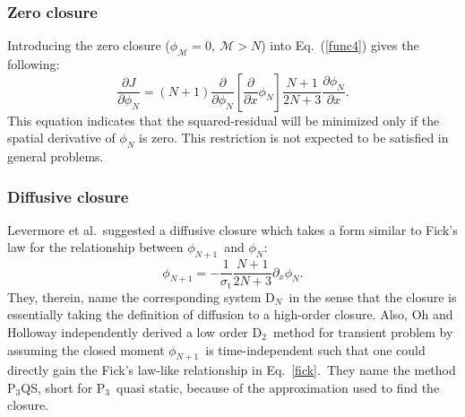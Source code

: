 \documentclass[review]{elsarticle}
\newcommand{\st}{\sigma_\mathrm{t}}
\newcommand{\pn}{P$_N$}
\newcommand{\dn}{D$_N$}
\newcommand{\ppz}{\partial_x}%
\newcommand{\psii}[1]{\phi_\ensuremath{{#1}}}
\begin{document}
\subsubsection{Zero closure}
Introducing the zero closure ($\psii{\mathcal{M}}=0,~\mathcal{M}>N$) into Eq.~(\ref{func4}) gives the following:
\begin{equation}\label{bd}
\frac{\partial J}{\partial\psii{N}}=(N+1)
\frac{\partial}{\partial\psii{N}}\left[\frac{\partial}{\partial x}\psii{N}\right]
\frac{N+1}{2N+3}\frac{\partial\phi_{N}}{\partial x}
.
\end{equation}
This equation indicates that the squared-residual will be minimized only if the spatial derivative of $\phi_N$ is zero.  This restriction is not expected to be satisfied in general problems.


\subsubsection{Diffusive closure}
Levermore et al.~suggested a diffusive closure which takes a form similar to Fick's law for the relationship between $\psii{N+1}$~and $\psii{N}$\cite{levermoredn}:
\begin{equation}\label{fick}
\psii{N+1}=-\frac{1}{\st}\frac{N+1}{2N+3}\ppz\psii{N}.
\end{equation}
They, therein, name the corresponding system D$_N$~in the sense that the closure is essentially taking the definition of diffusion to a high-order closure. Also, Oh and Holloway independently derived a low order D$_2$~method for transient problem by assuming the closed moment $\psii{N+1}$~is time-independent such that one could directly gain the Fick's law-like relationship in Eq.~\eqref{fick}\cite{p3qs}.~They name the method P$_3$QS, short for P$_3$~quasi static, because of the approximation used to find the closure. 
\end{document}
